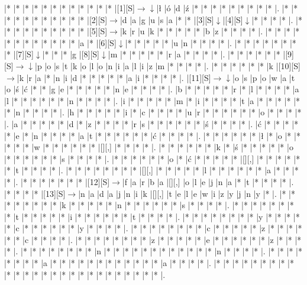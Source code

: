 \documentclass[11pt]{article}
\newcommand\drarr{$\rightarrow \!\!\!\!\! \downarrow$}
\newcommand\rarr{$\rightarrow$}
\newcommand\darr{$\downarrow$}
\begin{document}
\noindent\begin{Puzzle}{25}{26}|*	|*	|*	|*	|*	|*	|*	|*	|*	|*	|*	|*	|[1][S]\drarr	|ł	|ó	|d	|ź	|*	|*	|*	|*	|*	|*	|*	|*	|*	|.
|*	|*	|*	|*	|*	|*	|*	|*	|*	|*	|*	|[2][S]\rarr	|d	|a	|g	|u	|s	|a	|*	|*	|[3][S]\darr	|[4][S]\darr	|*	|*	|*	|*	|.
|*	|*	|*	|*	|*	|*	|*	|*	|*	|*	|[5][S]\rarr	|k	|r	|u	|k	|*	|*	|*	|*	|*	|b	|z	|*	|*	|*	|*	|.
|*	|*	|*	|*	|*	|*	|*	|*	|*	|*	|*	|*	|a	|*	|[6][S]\darr	|*	|*	|*	|*	|*	|u	|n	|*	|*	|*	|*	|.
|*	|*	|*	|*	|*	|*	|*	|*	|[7][S]\darr	|*	|*	|*	|g	|[8][S]\darr	|m	|*	|*	|*	|*	|*	|r	|a	|*	|*	|*	|*	|.
|*	|*	|*	|*	|*	|*	|[9][S]\drarr	|p	|o	|s	|t	|k	|o	|l	|o	|n	|i	|a	|l	|i	|z	|m	|*	|*	|*	|*	|.
|*	|*	|*	|*	|*	|*	|k	|[10][S]\rarr	|k	|r	|a	|*	|n	|i	|d	|*	|*	|*	|*	|*	|a	|i	|*	|*	|*	|*	|.
|[11][S]\drarr	|o	|s	|p	|o	|w	|a	|t	|o	|ś	|ć	|*	|*	|g	|e	|*	|*	|*	|*	|*	|n	|e	|*	|*	|*	|*	|.
|b	|*	|*	|*	|*	|*	|r	|*	|l	|*	|*	|*	|*	|a	|l	|*	|*	|*	|*	|*	|*	|n	|*	|*	|*	|*	|.
|i	|*	|*	|*	|*	|*	|m	|*	|i	|*	|*	|*	|*	|t	|a	|*	|*	|*	|*	|*	|*	|n	|*	|*	|*	|*	|.
|h	|*	|*	|*	|*	|*	|i	|*	|c	|*	|*	|*	|*	|u	|r	|*	|*	|*	|*	|*	|*	|o	|*	|*	|*	|*	|.
|a	|*	|*	|*	|*	|*	|d	|*	|z	|*	|*	|*	|*	|r	|s	|*	|*	|*	|*	|*	|*	|ś	|*	|*	|*	|*	|.
|ć	|*	|*	|*	|*	|*	|e	|*	|n	|*	|*	|*	|*	|a	|t	|*	|*	|*	|*	|*	|*	|ć	|*	|*	|*	|*	|.
|*	|*	|*	|*	|*	|*	|ł	|*	|o	|*	|*	|*	|*	|*	|w	|*	|*	|*	|*	|*	|*	|[][,]{ }	|*	|*	|*	|*	|.
|*	|*	|*	|*	|*	|*	|k	|*	|ś	|*	|*	|*	|*	|*	|o	|*	|*	|*	|*	|*	|*	|s	|*	|*	|*	|*	|.
|*	|*	|*	|*	|*	|*	|o	|*	|ć	|*	|*	|*	|*	|*	|[][,]{ }	|*	|*	|*	|*	|*	|*	|t	|*	|*	|*	|*	|.
|*	|*	|*	|*	|*	|*	|*	|*	|[][,]{ }	|*	|*	|*	|*	|*	|l	|*	|*	|*	|*	|*	|*	|a	|*	|*	|*	|*	|.
|*	|*	|*	|*	|*	|*	|*	|[12][S]\rarr	|f	|a	|r	|b	|a	|[][,]{ }	|o	|l	|e	|j	|n	|a	|*	|t	|*	|*	|*	|*	|.
|*	|*	|*	|*	|[13][S]\rarr	|n	|a	|d	|a	|j	|n	|i	|k	|[][,]{ }	|t	|e	|l	|e	|w	|i	|z	|y	|j	|n	|y	|*	|.
|*	|*	|*	|*	|*	|*	|*	|*	|k	|*	|*	|*	|*	|*	|n	|*	|*	|*	|*	|*	|*	|s	|*	|*	|*	|*	|.
|*	|*	|*	|*	|*	|*	|*	|*	|t	|*	|*	|*	|*	|*	|i	|*	|*	|*	|*	|*	|*	|t	|*	|*	|*	|*	|.
|*	|*	|*	|*	|*	|*	|*	|*	|y	|*	|*	|*	|*	|*	|c	|*	|*	|*	|*	|*	|*	|y	|*	|*	|*	|*	|.
|*	|*	|*	|*	|*	|*	|*	|*	|c	|*	|*	|*	|*	|*	|z	|*	|*	|*	|*	|*	|*	|c	|*	|*	|*	|*	|.
|*	|*	|*	|*	|*	|*	|*	|*	|z	|*	|*	|*	|*	|*	|e	|*	|*	|*	|*	|*	|*	|z	|*	|*	|*	|*	|.
|*	|*	|*	|*	|*	|*	|*	|*	|n	|*	|*	|*	|*	|*	|*	|*	|*	|*	|*	|*	|*	|n	|*	|*	|*	|*	|.
|*	|*	|*	|*	|*	|*	|*	|*	|a	|*	|*	|*	|*	|*	|*	|*	|*	|*	|*	|*	|*	|a	|*	|*	|*	|*	|.
|*	|*	|*	|*	|*	|*	|*	|*	|*	|*	|*	|*	|*	|*	|*	|*	|*	|*	|*	|*	|*	|*	|*	|*	|*	|*	|.\end{Puzzle}

\newpage
\end{document}
